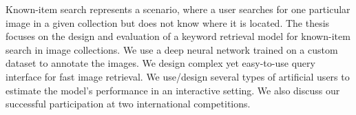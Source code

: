 \documentclass[12pt]{report}
\begin{document}

Known-item search represents a scenario, where a user searches for one particular image in a given collection but does not know where it is located. The thesis focuses on the design and evaluation of a keyword retrieval model for known-item search in image collections. We use a deep neural network trained on a custom dataset to annotate the images. We design complex yet easy-to-use query interface for fast image retrieval. We use/design several types of artificial users to estimate the model's performance in an interactive setting. We also discuss our successful participation at two international competitions.
\end{document}
